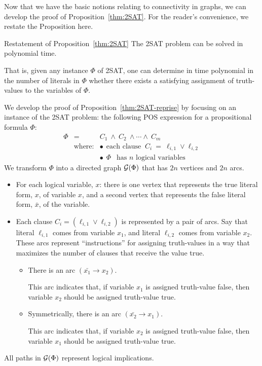 Now that we have the basic notions relating to connectivity in graphs,
we can develop the proof of Proposition~\ref{thm:2SAT}.  For the
reader's convenience, we restate the Proposition here.

\begin{prop}{Restatement of Proposition~\ref{thm:2SAT}}
\label{thm:2SAT-reprise}
The {\sf 2SAT} problem can be solved in polynomial time.

\noindent
That is, given any instance $\Phi$ of {\sf 2SAT}, one can determine in
time polynomial in the number of literals in $\Phi$ whether there
exists a satisfying assignment of truth-values to the variables of
$\Phi$.
\end{prop}

We develop the proof of Proposition~\ref{thm:2SAT-reprise} by focusing
on an instance of the {\sf 2SAT} problem: the following POS expression
for a propositional formula $\Phi$:
\begin{eqnarray}
\label{eq:Phi-2SAT}
\Phi & = & C_1 \ \wedge \ C_2 \ \wedge \cdots \wedge \ C_m \\
\nonumber
  & \mbox{where:} & \bullet \ \ \mbox{each clause }
 \ C_i \ = \ \ell_{i,1} \vee \ell_{i,2} \\
\nonumber
  &               & \bullet \ \ \Phi \ \ \mbox{ has $n$ logical variables}
\end{eqnarray}
We transform $\Phi$ into a directed graph $\mbox{$\cal G$}(\Phi)$ that has $2n$
vertices and $2n$ arcs.
\begin{itemize}
\item
For each logical variable, $x$: there is one vertex that represents
the {\sc true} literal form, $x$, of variable $x$, and a second vertex
that represents the {\sc false} literal form, $\bar{x}$, of the
variable.
\item
Each clause $C_i = (\ell_{i,1} \vee \ell_{i,2})$ is represented by a
pair of arcs.  Say that literal $\ell_{i,1}$ comes from variable
$x_1$, and literal $\ell_{i,2}$ comes from variable $x_2$.  These arcs
represent ``instructions'' for assigning truth-values in a way that
maximizes the number of clauses that receive the value {\sc true}.
  \begin{itemize}
  \item
There is an arc $(\bar{x_1} \rightarrow x_2)$.

This arc indicates that, if variable $x_1$ is assigned truth-value
{\sc false}, then variable $x_2$ should be assigned truth-value {\sc
  true}.
  \item
Symmetrically, there is an arc $(\bar{x_2} \rightarrow x_1)$.

This arc indicates that, if variable $x_2$ is assigned truth-value
{\sc false}, then variable $x_1$ should be assigned truth-value {\sc
  true}.
  \end{itemize}
\end{itemize}
All paths in $\mbox{$\cal G$}(\Phi)$ represent logical implications. 

